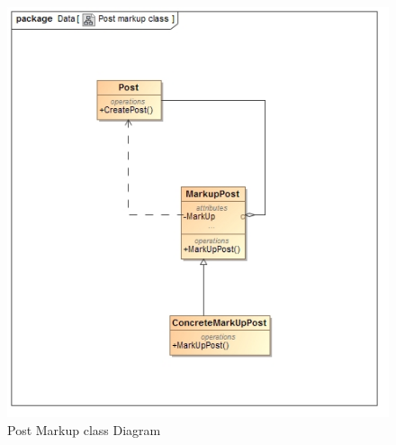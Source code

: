 \documentclass[11pt]{article}
\begin{document}
\begin{enumerate}
\graphicspath{ {../Diagrams/Matt/Class/} }
	  \begin{figure}[H]	
    	\includegraphics[scale=0.5]{PostmarkupClass.jpg}
    	\caption{Post Markup class Diagram}
	\end{figure}


\end{enumerate}
\end{document}
